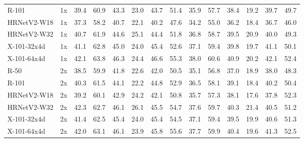 \documentclass[10pt,journal,compsoc]{IEEEtran}
\begin{document}
\begin{center}
\begin{longtable}{l|c|cccccc|cccccc}
	R-101       & 1x & 39.4 & 60.9 & 43.3 & 23.0 & 43.7 & 51.4 & 35.9 & 57.7 & 38.4 & 19.2 & 39.7 & 49.7 \\
	{HRNetV2-W18} & 1x & 37.3 & 58.2 & 40.7 & 22.1 & 40.2 & 47.6 & 34.2 & 55.0 & 36.2 & 18.4 & 36.7 & 46.0 \\
    {HRNetV2-W32} & 1x & 40.7 & 61.9 & 44.6 & 25.1 & 44.4 & 51.8 & 36.8 & 58.7 & 39.5 & 20.9 & 40.0 & 49.3 \\
	X-101-32x4d & 1x & 41.1 & 62.8 & 45.0 & 24.0 & 45.4 & 52.6 & 37.1 & 59.4 & 39.8 & 19.7 & 41.1 & 50.1 \\
	X-101-64x4d & 1x & 42.1 & 63.8 & 46.3 & 24.4 & 46.6 & 55.3 & 38.0 & 60.6 & 40.9 & 20.2 & 42.1 & 52.4 \\
	R-50        & 2x & 38.5 & 59.9 & 41.8 & 22.6 & 42.0 & 50.5 & 35.1 & 56.8 & 37.0 & 18.9 & 38.0 & 48.3 \\
	R-101       & 2x & 40.3 & 61.5 & 44.1 & 22.2 & 44.8 & 52.9 & 36.5 & 58.1 & 39.1 & 18.4 & 40.2 & 50.4 \\
	{HRNetV2-W18} & 2x & 39.2 & 60.1 & 42.9 & 24.2 & 42.1 & 50.8 & 35.7 & 57.3 & 38.1 & 17.6 & 37.8 & 52.3 \\
    {HRNetV2-W32} & 2x & 42.3 & 62.7 & 46.1 & 26.1 & 45.5 & 54.7 & 37.6 & 59.7 & 40.3 & 21.4 & 40.5 & 51.2 \\
	X-101-32x4d & 2x & 41.4 & 62.5 & 45.4 & 24.0 & 45.4 & 54.5 & 37.1 & 59.4 & 39.5 & 19.9 & 40.6 & 51.3 \\
	X-101-64x4d & 2x & 42.0 & 63.1 & 46.1 & 23.9 & 45.8 & 55.6 & 37.7 & 59.9 & 40.4 & 19.6 & 41.3 & 52.5 \\
	\hline


\end{longtable}
\end{center}
\end{document}
